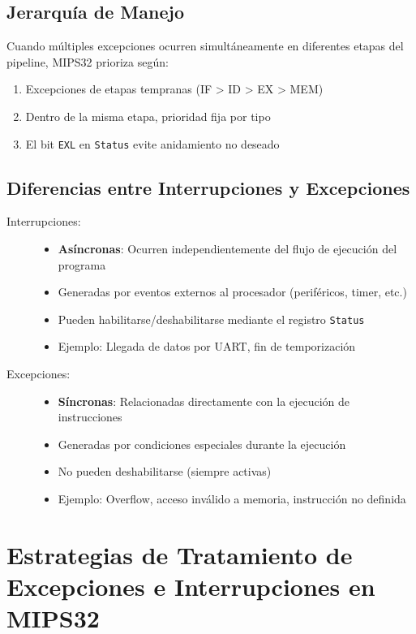 \documentclass{article}
\begin{document}
\subsection{Jerarquía de Manejo}

Cuando múltiples excepciones ocurren simultáneamente en diferentes etapas del pipeline, MIPS32 prioriza según:

\begin{enumerate}
    \item Excepciones de etapas tempranas (IF > ID > EX > MEM)
    \item Dentro de la misma etapa, prioridad fija por tipo
    \item El bit \texttt{EXL} en \texttt{Status} evite anidamiento no deseado
\end{enumerate}
\subsection{Diferencias entre Interrupciones y Excepciones}

\begin{description}
\item[Interrupciones:]
\begin{itemize}
    \item \textbf{Asíncronas}: Ocurren independientemente del flujo de ejecución del programa
    \item Generadas por eventos externos al procesador (periféricos, timer, etc.)
    \item Pueden habilitarse/deshabilitarse mediante el registro \texttt{Status}
    \item Ejemplo: Llegada de datos por UART, fin de temporización
\end{itemize}

\item[Excepciones:]
\begin{itemize}
    \item \textbf{Síncronas}: Relacionadas directamente con la ejecución de instrucciones
    \item Generadas por condiciones especiales durante la ejecución
    \item No pueden deshabilitarse (siempre activas)
    \item Ejemplo: Overflow, acceso inválido a memoria, instrucción no definida
\end{itemize}
\end{description}
\section{Estrategias de Tratamiento de Excepciones e Interrupciones en MIPS32}
\end{document}

